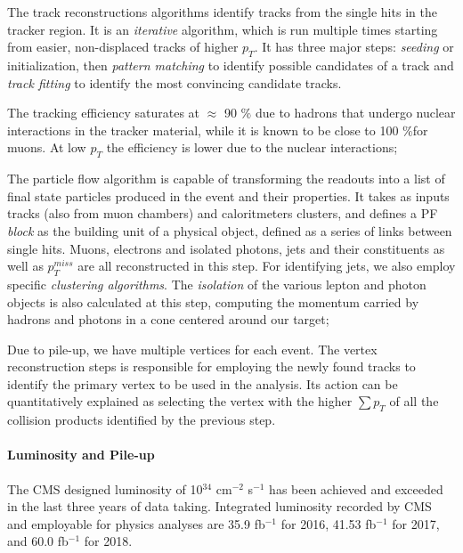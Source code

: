 \begin{outline}
    \1 The track reconstructions algorithms identify tracks from the single hits in the tracker region. It is an \emph{iterative} algorithm, which is run multiple times starting from easier, non-displaced tracks of higher $p_T$. It has three major steps: \emph{seeding} or initialization, then \emph{pattern matching} to identify possible candidates of a track and \emph{track fitting} to identify the most convincing candidate tracks.
    
    The tracking efficiency saturates at $\approx$ 90 $\%$ due to hadrons that undergo nuclear interactions in the tracker material, while it is known to be close to 100 $\%$for muons. At low $p_T$ the efficiency is lower due to the nuclear interactions;
    
    \1 The particle flow algorithm is capable of transforming the readouts into a list of final state particles produced in the event and their properties. It takes as inputs tracks (also from muon chambers) and caloritmeters clusters, and defines a PF \emph{block} as the building unit of a physical object, defined as a series of links between single hits. Muons, electrons and isolated photons, jets and their constituents as well as $p_T^{miss}$ are all reconstructed in this step. For identifying jets, we also employ specific \emph{clustering algorithms}. The \emph{isolation} of the various lepton and photon objects is also calculated at this step, computing the momentum carried by hadrons and photons in a cone centered around our target; 
    
    \1 Due to pile-up, we have multiple vertices for each event. The vertex reconstruction steps is responsible for employing the newly found tracks to identify the primary vertex to be used in the analysis. Its action can be quantitatively explained as selecting the vertex with the higher $\sum p_T$ of all the collision products identified by the previous step.
\end{outline}

\paragraph{Luminosity and Pile-up}

 The CMS designed luminosity of 10$^{34}$ cm$^{-2}$ s$^{-1}$ has been achieved and exceeded in the last three years of data taking. Integrated luminosity recorded by CMS and employable for physics analyses are 35.9 fb$^{-1}$ for 2016, 41.53 fb$^{-1}$ for 2017, and 60.0 fb$^{-1}$ for 2018.

